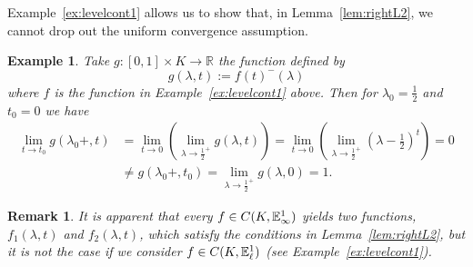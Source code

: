 \documentclass{amsart}
\newtheorem{example}[theorem]{Example}
\newtheorem{remark}[theorem]{Remark}
\newcommand{\R}{{\mathbb{R}}}
\newcommand{\fn}{\mathbb{E}\sp{1}}
\begin{document}
Example~\ref{ex:levelcont1} allows us to show that, in Lemma~\ref{lem:rightL2}, we cannot drop out  the uniform convergence assumption.
\begin{example}\label{ex:levelcont2}
Take $g:[0,1]\times K\rightarrow \R$ the function defined by
$$g(\lambda,t):=f(t)^-(\lambda)$$
where $f$ is the function in Example~\ref{ex:levelcont1} above. Then
for $\lambda_0=\frac{1}{2}$ and $t_0=0$  we have
\begin{align*}
\lim_{t\to t_0} g(\lambda_0+,t) &=\lim_{t\to 0} \left(\lim_{\lambda\to \frac{1}{2}^+} g(\lambda,t)\right) =
\lim_{t\to 0} \left(\lim_{\lambda\to \frac{1}{2}^+} \left(\lambda-\frac{1}{2}\right)^t \right)=0\\[2ex]
&\neq g(\lambda_0+,t_0)=\lim_{\lambda\to \frac{1}{2}^+} g(\lambda, 0)=1.
\end{align*}

 \end{example}
 \begin{remark}
It is apparent that every $f\in C(K,\fn_{\infty})$ yields two functions, $f_1(\lambda,t)$ and $f_2(\lambda,t)$, which satisfy the conditions in Lemma~\ref{lem:rightL2}, but it is not the case if we consider $f\in C(K,\fn_{\ell})$ (see Example~\ref{ex:levelcont1}).
 \end{remark}
\end{document}
